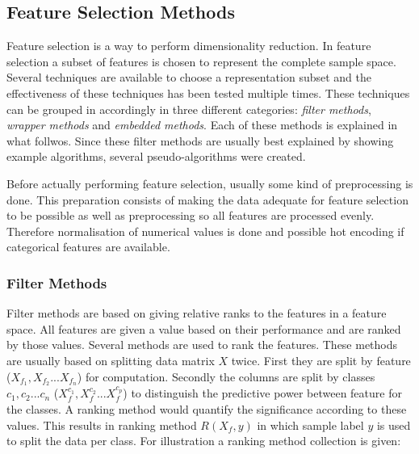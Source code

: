 \documentclass[10pt,a4paper]{report}
\begin{document}
	\subsection{Feature Selection Methods}
	\label{FSsubsec:FeatureSelectionMethods}
	
	Feature selection is a way to perform dimensionality reduction. In feature selection a subset of features is chosen to represent the complete sample space\cite{Guyon2006}. Several techniques are available to choose a representation subset and the effectiveness of these techniques has been tested multiple times\cite{CATAL20091040, molina2002feature, chandrashekar2014survey}. These techniques can be grouped in accordingly in three different categories: \textit{filter methods}, \textit{wrapper methods} and \textit{embedded methods}\cite{saeys2007review}. Each of these methods is explained in what follwos. Since these filter methods are usually best explained by showing example algorithms, several pseudo-algorithms were created.
	
	Before actually performing feature selection, usually some kind of preprocessing is done. This preparation consists of making the data adequate for feature selection to be possible as well as preprocessing so all features are processed evenly. Therefore normalisation of numerical values is done and possible hot encoding if categorical features are available. 
	
	\subsubsection{Filter Methods}
	\label{FSsubsec:FilterMethods}
	
	Filter methods are based on giving relative ranks to the features in a feature space. All features are given a value based on their performance and are ranked by those values\cite{Duch2006, saeys2007review}. Several methods are used to rank the features. These methods are usually based on splitting data matrix $X$ twice. First they are split by feature ($X_{f_1}, X_{f_2} ... X_{f_n}$) for computation. Secondly the columns are split by classes $c_1, c_2 ... c_n$ ($X_{f}^{c_1}, X_{f}^{c_2} ... X_{f}^{c_p}$) to distinguish the predictive power between feature for the classes. A ranking method would quantify the significance according to these values. This results in ranking method $R(X_f, y)$ in which sample label $y$ is used to split the data per class. For illustration a ranking method collection is given:
	
\end{document}
